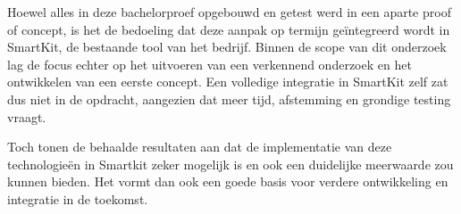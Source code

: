 Hoewel alles in deze bachelorproef opgebouwd en getest werd in een aparte proof of concept, is het de bedoeling dat deze aanpak op termijn geïntegreerd wordt in SmartKit, de bestaande tool van het bedrijf. Binnen de scope van dit onderzoek lag de focus echter op het uitvoeren van een verkennend onderzoek en het ontwikkelen van een eerste concept. Een volledige integratie in SmartKit zelf zat dus niet in de opdracht, aangezien dat meer tijd, afstemming en grondige testing vraagt.

Toch tonen de behaalde resultaten aan dat de implementatie van deze technologieën in Smartkit zeker mogelijk is en ook een duidelijke meerwaarde zou kunnen bieden. Het vormt dan ook een goede basis voor verdere ontwikkeling en integratie in de toekomst.







